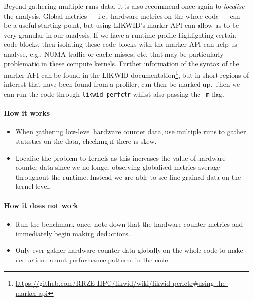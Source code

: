 Beyond gathering multiple runs data, it is also recommend once again to
\emph{localise} the analysis. Global metrics --- i.e., hardware metrics on the
whole code --- can be a useful starting point, but using LIKWID's marker API
can allow us to be very granular in our analysis. If we have a runtime profile
highlighting certain code blocks, then isolating these code blocks with the
marker API can help us analyse, e.g., NUMA traffic or cache misses, etc. that
may be particularly problematic in these compute kernels. Further information
of the syntax of the marker API can be found in the LIKWID
documentation\footnote{\url{https://github.com/RRZE-HPC/likwid/wiki/likwid-perfctr\#using-the-marker-api}},
but in short regions of interest that have been found from a profiler, can then
be marked up. Then we can run the code through \texttt{likwid-perfctr} whilst
also passing the \texttt{-m} flag.

\paragraph*{How it works}

\begin{itemize}[noitemsep]
  \item[$\boxplus$] When gathering low-level hardware counter data, use multiple runs to gather statistics on the data, checking if there is skew.
  \item[$\boxplus$] Localise the problem to kernels as this increases the value of hardware counter data since we no longer observing globalised metrics average throughout the runtime. Instead we are able to see fine-grained data on the kernel level.

\end{itemize}


\paragraph*{How it does not work}

\begin{itemize}[noitemsep]
  \item[$\boxminus$] Run the benchmark once, note down that the hardware counter metrics and immediately begin making deductions.
  \item[$\boxminus$] Only ever gather hardware counter data globally on the whole code to make deductions about performance patterns in the code.
\end{itemize}
